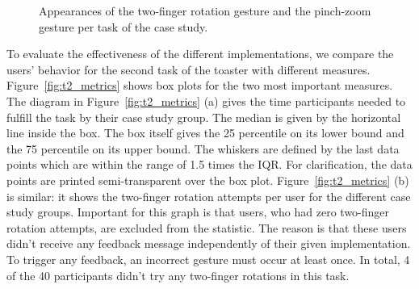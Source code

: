 \documentclass[manuscript]{acmart}
\begin{document}
			\begin{figure}[H]
				\centering
				\caption{Appearances of the two-finger rotation gesture and the pinch-zoom gesture per task of the case study.}
				\label{fig:tfr_v_pz}
			\end{figure}

			To evaluate the effectiveness of the different implementations, we compare the users' behavior for the second task of the toaster with different measures. Figure~\ref{fig:t2_metrics} shows box plots for the two most important measures. The diagram in Figure~\ref{fig:t2_metrics} (a) gives the time participants needed to fulfill the task by their case study group. The median is given by the horizontal line inside the box. The box itself gives the 25 percentile on its lower bound and the 75 percentile on its upper bound. The whiskers are defined by the last data points which are within the range of 1.5 times the IQR. For clarification, the data points are printed semi-transparent over the box plot. Figure~\ref{fig:t2_metrics} (b) is similar: it shows the two-finger rotation attempts per user for the different case study groups. Important for this graph is that users, who had zero two-finger rotation attempts, are excluded from the statistic. The reason is that these users didn't receive any feedback message independently of their given implementation. To trigger any feedback, an incorrect gesture must occur at least once. In total, 4 of the 40 participants didn't try any two-finger rotations in this task.
\end{document}

